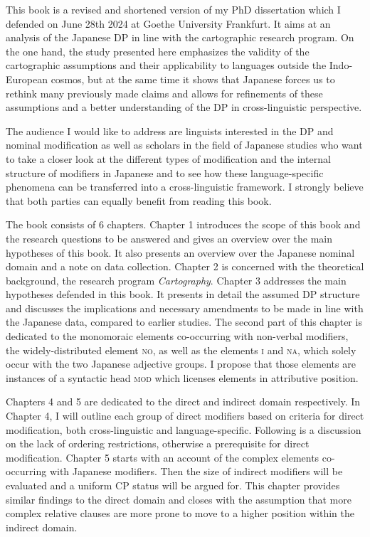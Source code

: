 \addchap{\lsPrefaceTitle}
\markdouble{\lsPrefaceTitle}
 

This book is a revised and shortened version of my PhD dissertation which I defended on June 28th 2024 at Goethe University Frankfurt. It aims at an analysis of the Japanese DP in line with the cartographic research program. On the one hand, the study presented here emphasizes the validity of the cartographic assumptions and their applicability to languages outside the Indo-European cosmos, but at the same time it shows that Japanese forces us to rethink many previously made claims and allows for refinements of these assumptions and a better understanding of the DP in cross-linguistic perspective.

The audience I would like to address are linguists interested in the DP and nominal modification as well as scholars in the field of Japanese studies who want to take a closer look at the different types of modification and the internal structure of modifiers in Japanese and to see how these language-specific phenomena can be transferred into a cross-linguistic framework. I strongly believe that both parties can equally benefit from reading this book.

The book consists of 6 chapters. Chapter 1 introduces the scope of this book and the research questions to be answered and gives an overview over the main hypotheses of this book. It also presents an overview over the Japanese nominal domain and a note on data collection. Chapter 2 is concerned with the theoretical background, the research program \textit{Cartography}. Chapter 3 addresses the main hypotheses defended in this book. It presents in detail the assumed DP structure and discusses the implications and necessary amendments to be made in line with the Japanese data, compared to earlier studies. The second part of this chapter is dedicated to the monomoraic elements co-occurring with non-verbal modifiers, the widely-distributed element \textsc{no}, as well as the elements \textsc{i} and \textsc{na}, which solely occur with the two Japanese adjective groups. I propose that those elements are instances of a syntactic head \textsc{mod} which licenses elements in attributive position.

Chapters 4 and 5 are dedicated to the direct and indirect domain respectively. In Chapter 4, I will outline each group of direct modifiers based on criteria for direct modification, both cross-linguistic and language-specific. Following is a discussion on the lack of ordering restrictions, otherwise a prerequisite for direct modification. Chapter 5 starts with an account of the complex elements co-occurring with Japanese modifiers. Then the size of indirect modifiers will be evaluated and a uniform CP status will be argued for. This chapter provides similar findings to the direct domain and closes with the assumption that more complex relative clauses are more prone to move to a higher position within the indirect domain.

